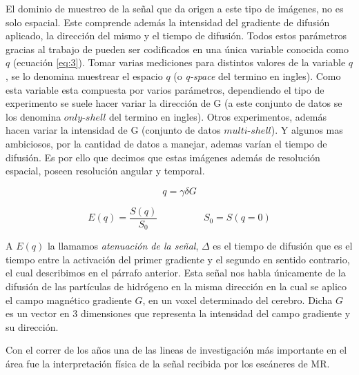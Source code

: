 El dominio de muestreo de la señal que da origen a este tipo de imágenes, no es solo 
espacial. Este comprende además la intensidad del gradiente de difusión aplicado, la dirección del mismo y el 
tiempo de difusión. Todos estos parámetros gracias al trabajo de \citet{CALLAGHAN1990177} pueden ser codificados en una única variable 
conocida como $q$ (ecuación \ref{eq:3}). Tomar varias mediciones para distintos valores de la variable $q$, se lo denomina 
muestrear el espacio $q$ (o \textit{q-space} del termino en ingles). Como esta variable esta compuesta por varios parámetros, dependiendo el tipo de experimento se 
suele hacer variar la dirección de G (a este conjunto de datos se los denomina $only$-$shell$ del termino en ingles). Otros experimentos,
además hacen variar la intensidad de G (conjunto de datos $multi$-$shell$). Y algunos mas ambiciosos, por la cantidad de datos a manejar, 
ademas varían el tiempo de difusión. Es por ello que decimos que estas imágenes además de resolución espacial, poseen resolución angular y temporal.


\begin{equation} 
\label{eq:3}
 q = \gamma \delta G
\end{equation}

\begin{equation} 
\label{eq:2}
E(q) = \frac{S(q)}{S_0} \hspace{2cm} S_0=S(q=0)
\end{equation}


A $E(q)$ la llamamos \textit{atenuaci\'on de la señal},  
$\Delta$ es el tiempo de difusión que es el tiempo entre la activación del primer gradiente y el segundo en 
sentido contrario, el cual describimos en el párrafo anterior. Esta señal nos 
habla \'unicamente de la difusi\'on de las part\'iculas de hidr\'ogeno en la misma 
direcci\'on en la cual se aplico el campo magn\'etico gradiente $G$, en un voxel determinado del 
cerebro. Dicha $G$ es un vector en 3 dimensiones que representa la intensidad 
del campo gradiente y su direcci\'on.


Con el correr de los años una de las lineas de investigación más 
importante en el \'area fue la interpretaci\'on f\'isica de la se\~nal recibida 
por los escáneres de MR.  



